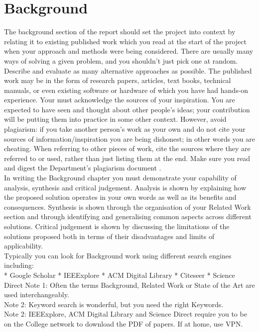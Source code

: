 \documentclass[12pt,twoside]{article}
\begin{document}
\newpage


\section{Background}
The background section of the report should set the project into context by relating it to existing published work which you read at the start of the project when your approach and methods were being considered. There are usually many ways of solving a given problem, and you shouldn't just pick one at random. Describe and evaluate as many alternative approaches as possible. The published work may be in the form of research papers, articles, text books, technical manuals, or even existing software or hardware of which you have had hands-on experience. Your must acknowledge the sources of your inspiration. You are expected to have seen and thought about other people's ideas; your contribution will be putting them into practice in some other context. However, avoid plagiarism: if you take another person's work as your own and do not cite your sources of information/inspiration you are being dishonest; in other words you are cheating. When referring to other pieces of work, cite the sources where they are referred to or used, rather than just listing them at the end. Make sure you read and digest the Department's plagiarism document .\\
In writing the Background chapter you must demonstrate your capability of analysis, synthesis and critical judgement. Analysis is shown by explaining how the proposed solution operates in your own words as well as its benefits and consequences. Synthesis is shown through the organisation of your Related Work section and through identifying and generalising common aspects across different solutions. Critical judgement is shown by discussing the limitations of the solutions proposed both in terms of their disadvantages and limits of applicability.\\
Typically you can look for Background work using different search engines including:\\
* Google Scholar
* IEEExplore
* ACM Digital Library
* Citeseer
* Science Direct
Note 1: Often the terms Background, Related Work or State of the Art are used interchangeably.\\
Note 2: Keyword search is wonderful, but you need the right Keywords.\\
Note 2: IEEExplore, ACM Digital Library and Science Direct require you to be on the College network to download the PDF of papers. If at home, use VPN.\\
\end{document}
